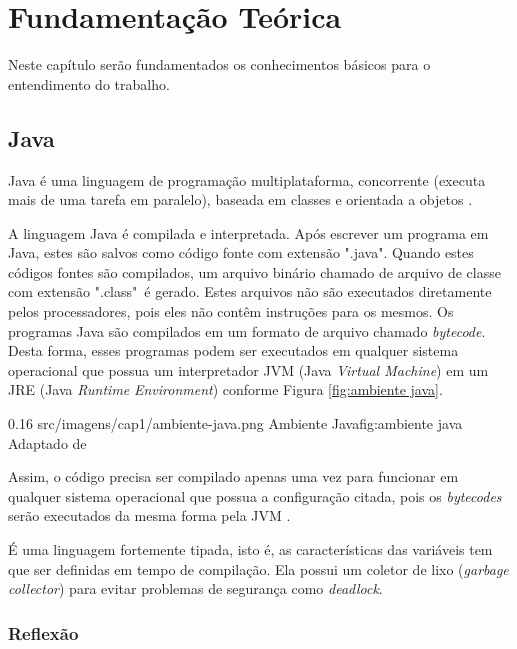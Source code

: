 \chapter{Fundamentação Teórica}
\label{ch:fundamentacao}
\par Neste capítulo ser\~ao fundamentados os conhecimentos b\'asicos para o entendimento do trabalho.

\section{Java}

\par Java é uma linguagem de programação multiplataforma, concorrente (executa mais de uma tarefa em paralelo), baseada em classes e orientada a objetos \cite{joy2000java}.

\par A linguagem Java é compilada e interpretada. Após escrever um programa em Java, estes são salvos como código fonte com extensão ".java". Quando estes códigos fontes são compilados, um arquivo binário chamado de arquivo de classe com extensão ".class"\ é gerado. Estes arquivos não são executados diretamente pelos processadores, pois eles não contêm instruções para os mesmos. Os programas Java são compilados em um formato de arquivo chamado \textit{bytecode}. Desta forma, esses programas podem ser executados em qualquer sistema operacional que possua um interpretador JVM (Java \textit{Virtual Machine}) em um JRE (Java \textit{Runtime} \textit{Environment}) conforme Figura \ref{fig:ambiente java}.

\begin{image}
{0.16}
{src/imagens/cap1/ambiente-java.png}
{Ambiente Java}{fig:ambiente java}
{Adaptado de }
\end{image}

Assim, o código precisa ser compilado apenas uma vez para funcionar em qualquer sistema operacional que possua a configuração citada, pois os \textit{bytecodes} serão executados da mesma forma pela JVM \cite{arnold2005java}.

\par É uma linguagem fortemente tipada, isto é, as características das variáveis tem que ser definidas em tempo de compilação. Ela possui um coletor de lixo (\textit{garbage collector}) para evitar problemas de segurança como \textit{deadlock}. \cite{joy2000java}

\subsection{Reflexão}

